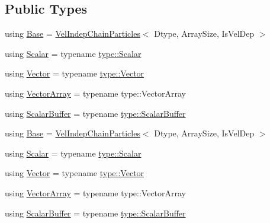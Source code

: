 \subsection*{Public Types}
\begin{DoxyCompactItemize}
\item 
using \mbox{\hyperlink{class_space_h_1_1_vel_dep_chain_particles_aca1c605196c7fff9e15ea7ed97da7cfe}{Base}} = \mbox{\hyperlink{class_space_h_1_1_vel_indep_chain_particles}{Vel\+Indep\+Chain\+Particles}}$<$ Dtype, Array\+Size, Is\+Vel\+Dep $>$
\item 
using \mbox{\hyperlink{class_space_h_1_1_vel_dep_chain_particles_a1f624cc5755ed9e9c7f3a519730fc232}{Scalar}} = typename \mbox{\hyperlink{struct_space_h_1_1_proto_type_af3c8245d83d9db64749882920de5c274}{type\+::\+Scalar}}
\item 
using \mbox{\hyperlink{class_space_h_1_1_vel_dep_chain_particles_a954578905c7d7d1830c8e6eb95bc7eb6}{Vector}} = typename \mbox{\hyperlink{struct_space_h_1_1_proto_type_a316b81f4660b2b4fab14a8e1f23b6089}{type\+::\+Vector}}
\item 
using \mbox{\hyperlink{class_space_h_1_1_vel_dep_chain_particles_ab2a1081b63c60af35e99d3d2250fb8ee}{Vector\+Array}} = typename type\+::\+Vector\+Array
\item 
using \mbox{\hyperlink{class_space_h_1_1_vel_dep_chain_particles_a1b6480883ff99b7648c1a68a714af20f}{Scalar\+Buffer}} = typename \mbox{\hyperlink{struct_space_h_1_1_proto_type_a62c491884996da10377d348a5aabad86}{type\+::\+Scalar\+Buffer}}
\item 
using \mbox{\hyperlink{class_space_h_1_1_vel_dep_chain_particles_aca1c605196c7fff9e15ea7ed97da7cfe}{Base}} = \mbox{\hyperlink{class_space_h_1_1_vel_indep_chain_particles}{Vel\+Indep\+Chain\+Particles}}$<$ Dtype, Array\+Size, Is\+Vel\+Dep $>$
\item 
using \mbox{\hyperlink{class_space_h_1_1_vel_dep_chain_particles_a1f624cc5755ed9e9c7f3a519730fc232}{Scalar}} = typename \mbox{\hyperlink{struct_space_h_1_1_proto_type_af3c8245d83d9db64749882920de5c274}{type\+::\+Scalar}}
\item 
using \mbox{\hyperlink{class_space_h_1_1_vel_dep_chain_particles_a954578905c7d7d1830c8e6eb95bc7eb6}{Vector}} = typename \mbox{\hyperlink{struct_space_h_1_1_proto_type_a316b81f4660b2b4fab14a8e1f23b6089}{type\+::\+Vector}}
\item 
using \mbox{\hyperlink{class_space_h_1_1_vel_dep_chain_particles_ab2a1081b63c60af35e99d3d2250fb8ee}{Vector\+Array}} = typename type\+::\+Vector\+Array
\item 
using \mbox{\hyperlink{class_space_h_1_1_vel_dep_chain_particles_a1b6480883ff99b7648c1a68a714af20f}{Scalar\+Buffer}} = typename \mbox{\hyperlink{struct_space_h_1_1_proto_type_a62c491884996da10377d348a5aabad86}{type\+::\+Scalar\+Buffer}}
\end{DoxyCompactItemize}

